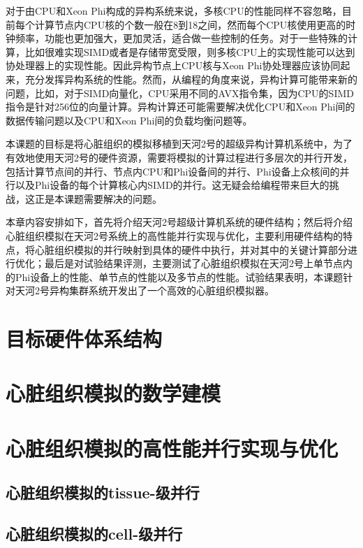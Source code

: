 对于由CPU和Xeon Phi构成的异构系统来说，多核CPU的性能同样不容忽略，目前每个计算节点内CPU核的个数一般在8到18之间，然而每个CPU核使用更高的时钟频率，功能也更加强大，更加灵活，适合做一些控制的任务。对于一些特殊的计算，比如很难实现SIMD或者是存储带宽受限，则多核CPU上的实现性能可以达到协处理器上的实现性能。因此异构节点上CPU核与Xeon Phi协处理器应该协同起来，充分发挥异构系统的性能。然而，从编程的角度来说，异构计算可能带来新的问题，比如，对于SIMD向量化，CPU采用不同的AVX指令集，因为CPU的SIMD指令是针对256位的向量计算。异构计算还可能需要解决优化CPU和Xeon Phi间的数据传输问题以及CPU和Xeon Phi间的负载均衡问题等。

本课题的目标是将心脏组织的模拟移植到天河2号的超级异构计算机系统中，为了有效地使用天河2号的硬件资源，需要将模拟的计算过程进行多层次的并行开发，包括计算节点间的并行、节点内CPU和Phi设备间的并行、Phi设备上众核间的并行以及Phi设备的每个计算核心内SIMD的并行。这无疑会给编程带来巨大的挑战，这正是本课题需要解决的问题。

本章内容安排如下，首先将介绍天河2号超级计算机系统的硬件结构；然后将介绍心脏组织模拟在天河2号系统上的高性能并行实现与优化，主要利用硬件结构的特点，将心脏组织模拟的并行映射到具体的硬件中执行，并对其中的关键计算部分进行优化；最后是对试验结果评测，主要测试了心脏组织模拟在天河2号上单节点内的Phi设备上的性能、单节点的性能以及多节点的性能。试验结果表明，本课题针对天河2号异构集群系统开发出了一个高效的心脏组织模拟器。

\section{目标硬件体系结构}

\section{心脏组织模拟的数学建模}


\section{心脏组织模拟的高性能并行实现与优化}

 \subsection{心脏组织模拟的tissue-级并行}
 
 \subsection{心脏组织模拟的cell-级并行}

